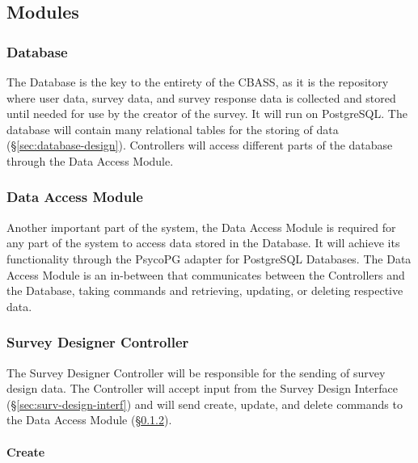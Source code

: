 \documentclass{article}
\begin{document}
\subsection{Modules}
\label{sec:modules}

\subsubsection{Database}
\label{sec:database}

The Database is the key to the entirety of the CBASS, as it is the
repository where user data, survey data, and survey response data is
collected and stored until needed for use by the creator of the
survey.  It will run on PostgreSQL.  The database will contain many
relational tables for the storing of data
(\S\ref{sec:database-design}).  Controllers will access different
parts of the database through the Data Access Module.

\subsubsection{Data Access Module}
\label{sec:data-access-module}

Another important part of the system, the Data Access Module is
required for any part of the system to access data stored in the
Database.  It will achieve its functionality through the PsycoPG adapter
for PostgreSQL Databases.  The Data Access Module is an in-between that
communicates between the Controllers and the Database, taking commands
and retrieving, updating, or deleting respective data.

\subsubsection{Survey Designer Controller}
\label{sec:survey-designer}

The Survey Designer Controller will be responsible for the sending of
survey design data.  The Controller will accept input from the
Survey Design Interface (\S\ref{sec:surv-design-interf}) and will send create, update, and
delete commands to the Data Access Module (\S\ref{sec:data-access-module}).

\paragraph{Create}
\label{sec:survey-designer-create}
\end{document}
